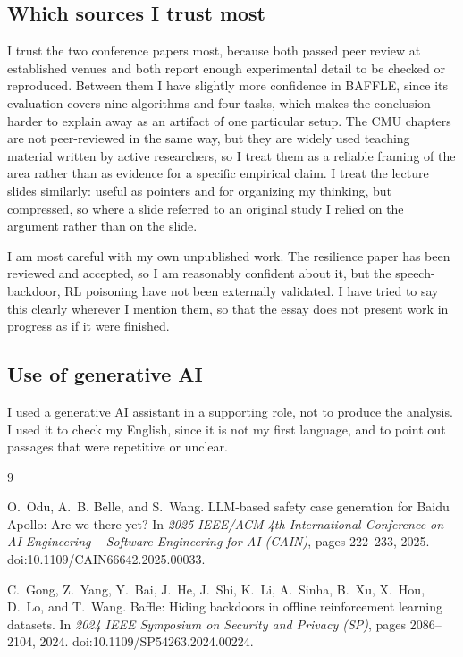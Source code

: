 \documentclass[11pt,a4paper]{article}
\begin{document}
\subsection{Which sources I trust most}

I trust the two conference papers most, because both passed peer review at established venues and both report enough experimental detail to be checked or reproduced. Between them I have slightly more confidence in BAFFLE, since its evaluation covers nine algorithms and four tasks, which makes the conclusion harder to explain away as an artifact of one particular setup. The CMU chapters are not peer-reviewed in the same way, but they are widely used teaching material written by active researchers, so I treat them as a reliable framing of the area rather than as evidence for a specific empirical claim. I treat the lecture slides similarly: useful as pointers and for organizing my thinking, but compressed, so where a slide referred to an original study I relied on the argument rather than on the slide.

I am most careful with my own unpublished work. The resilience paper has been reviewed and accepted, so I am reasonably confident about it, but the speech-backdoor, RL poisoning have not been externally validated. I have tried to say this clearly wherever I mention them, so that the essay does not present work in progress as if it were finished.

\subsection{Use of generative AI}

I used a generative AI assistant in a supporting role, not to produce the analysis. I used it to check my English, since it is not my first language, and to point out passages that were repetitive or unclear.

\begin{thebibliography}{9}

O.~Odu, A.~B. Belle, and S.~Wang.
\newblock LLM-based safety case generation for Baidu Apollo: Are we there yet?
\newblock In \textit{2025 IEEE/ACM 4th International Conference on AI Engineering -- Software Engineering for AI (CAIN)}, pages 222--233, 2025.
\newblock doi:10.1109/CAIN66642.2025.00033.

C.~Gong, Z.~Yang, Y.~Bai, J.~He, J.~Shi, K.~Li, A.~Sinha, B.~Xu, X.~Hou, D.~Lo, and T.~Wang.
\newblock Baffle: Hiding backdoors in offline reinforcement learning datasets.
\newblock In \textit{2024 IEEE Symposium on Security and Privacy (SP)}, pages 2086--2104, 2024.
\newblock doi:10.1109/SP54263.2024.00224.

\end{thebibliography}
\end{document}
